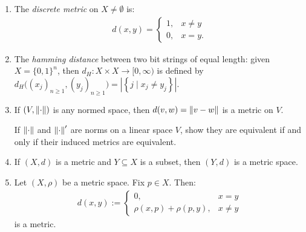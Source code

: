     \begin{example}
        \phantom{a}
        \begin{enumerate}[label = (\arabic*),itemsep=1pt,topsep=3pt]
            \item The \textit{discrete metric} on $X \neq \emptyset$ is:
                \begin{equation*}
                \begin{split}
                    d(x,y) = \begin{cases}1, & x \neq y \\ 0, & x =y  .\end{cases}
                \end{split}
                \end{equation*}

            \item The \textit{hamming distance} between two bit strings of equal length: given $X = \{0,1\}^n$, then $d_H:X \times X \rightarrow [0,\infty)$ is defined by $d_H\bigl( (x_j)_{n \geq 1}, (y_j)_{n \geq 1}\bigr) = \left| \left\{ j \mid x_j \neq y_j \right\} \right|$.
            
            \item If $(V,\left\lVert \cdot \right\rVert)$ is any normed space, then $d(v,w) = \left\lVert v -w  \right\rVert$ is a metric on $V$.
                \begin{exercise}
                    If $\left\lVert \cdot \right\rVert$ and $\left\lVert \cdot \right\rVert'$ are norms on a linear space $V$, show they are equivalent if and only if their induced metrics are equivalent.
                \end{exercise}

            \item If $(X,d)$ is a metric and $Y \subseteq X$ is a subset, then $(Y,d)$ is a metric space.
            
            \item Let $(X,\rho)$ be a metric space. Fix $p \in X$. Then:
                \begin{equation*}
                \begin{split}
                    d(x,y) := \begin{cases} 0, &x=y \\ \rho(x,p) + \rho(p,y), & x \neq y \end{cases}
                \end{split}
                \end{equation*}
            is a metric.


\end{enumerate}
\end{example}
